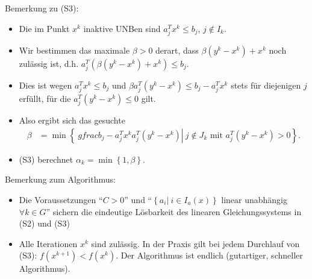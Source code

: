 Bemerkung zu (S3):
\begin{itemize}
  \item[] Die im Punkt $x^k$ inaktive UNBen sind $a_j^Tx^k\le b_j$, $j\notin I_k$.
  \item[] Wir bestimmen das maximale $\beta > 0$ derart, dass $\beta(y^k-x^k)+x^k$ noch zulässig ist, d.h. $a_j^T(\beta(y^k-x^k)+x^k)\le b_j$.
  \item[] Dies ist wegen $a_j^Tx^k\le b_j$ und $\beta a_j^T(y^k-x^k)\le b_j-a_j^Tx^k$ stets für diejenigen $j$ erfüllt, für die $a_j^T(y^k-x^k)\le 0$ gilt. 
  \item[] Also ergibt sich das gesuchte \begin{align*}
  \beta & = \min\left\{\left.\ gfrac{b_j-a_j^Tx^k}{a_j^T(y^k-x^k)}\right|\ j\notin J_k\text{ mit } a_j^T(y^k-x^k)>0 \right\}.
  \end{align*}
  \item[] (S3) berechnet $\alpha_k=\min\left\{1,\beta\right\}$.
\end{itemize}

Bemerkung zum Algorithmus:
\begin{itemize}
  \item Die Voraussetzungen ``$C>0$'' und ``$\left\{a_i|\ i\in I_a(x)\right\}$ linear unabhängig $\forall k\in G$'' sichern die eindeutige Lösbarkeit des linearen Gleichungssystems in
  (S2) und (S3)
  \item Alle Iterationen $x^k$ sind zulässig. In der Praxis gilt bei jedem Durchlauf von (S3): $f(x^{k+1})<f(x^k)$. Der Algorithmus ist endlich (gutartiger, schneller Algorithmus).
\end{itemize}

